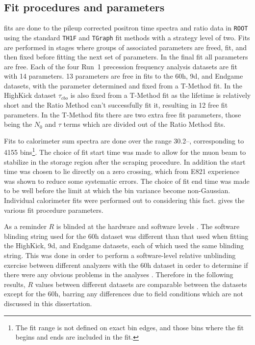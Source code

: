 \subsection{Fit procedures and parameters}

\chisq fits are done to the pileup corrected positron time spectra and ratio data in \texttt{ROOT} using the standard \texttt{TH1F} and \texttt{TGraph} fit methods with a strategy level of two. Fits are performed in stages where groups of associated parameters are freed, fit, and then fixed before fitting the next set of parameters. In the final fit all parameters are free. Each of the four Run~1 precession frequency analysis datasets are fit with 14 parameters. 13 parameters are free in fits to the 60h, 9d, and Endgame datasets, with the \K parameter determined and fixed from a T-Method fit. In the HighKick dataset $\tau_{cbo}$ is also fixed from a T-Method fit as the lifetime is relatively short and the Ratio Method can't successfully fit it, resulting in 12 free fit parameters. In the T-Method fits there are two extra free fit parameters, those being the $N_{0}$ and $\tau$ terms which are divided out of the Ratio Method fits.

Fits to calorimeter sum spectra are done over the range 30.2--, corresponding to 4155 bins\footnote{The fit range is not defined on exact bin edges, and those bins where the fit begins and ends are included in the fit.}. The choice of fit start time was made to allow for the muon beam to stabilize in the storage region after the scraping procedure. In addition the start time was chosen to lie directly on a \gmtwo zero crossing, which from E821 experience was shown to reduce some systematic errors. The choice of fit end time was made to be well before the limit at which the bin variance become non-Gaussian. Individual calorimeter fits were performed out to  considering this fact.  gives the various fit procedure parameters.


As a reminder $R$ is blinded at the hardware and software levels \cite{ClockManual,SoftwareBlinding}. The software blinding string used for the 60h dataset was different than that used when fitting the HighKick, 9d, and Endgame datasets, each of which used the same blinding string. This was done in order to perform a software-level relative unblinding exercise between different analyzers with the 60h dataset in order to determine if there were any obvious problems in the analyses \cite{BU60hReport,60hUnblinding}. Therefore in the following results, $R$ values between different datasets are comparable between the datasets except for the 60h, barring any differences due to field conditions which are not discussed in this dissertation.


